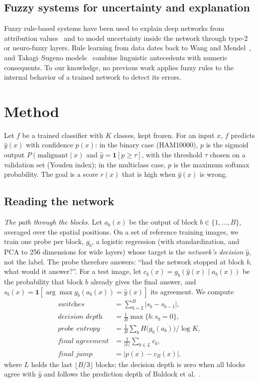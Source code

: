 \subsection{Fuzzy systems for uncertainty and explanation}
Fuzzy rule-based systems have been used to explain deep networks from attribution values~\cite{aghaeipoor2023} and to model uncertainty
inside the network through type-2 or neuro-fuzzy layers. Rule learning from data dates back to Wang and Mendel~\cite{wangmendel1992},
and Takagi--Sugeno models~\cite{takagi1985} combine linguistic antecedents with numeric consequents. To our knowledge, no previous work
applies fuzzy rules to the internal behavior of a trained network to detect its errors.

\section{Method}

Let $f$ be a trained classifier with $K$ classes, kept frozen. For an input $x$, $f$ predicts $\hat y(x)$ with confidence $p(x)$:
in the binary case (HAM10000), $p$ is the sigmoid output $P(\text{malignant}\mid x)$ and $\hat y = \mathbf{1}[p \ge \tau]$, with the
threshold $\tau$ chosen on a validation set (Youden index); in the multiclass case, $p$ is the maximum softmax probability.
The goal is a score $r(x)$ that is high when $\hat y(x)$ is wrong.

\subsection{Reading the network}
\label{sec:reading}

\textit{The path through the blocks.}
Let $a_b(x)$ be the output of block $b \in \{1,\dots,B\}$, averaged over the spatial positions. On a set of reference training images,
we train one probe per block, $g_b$, a logistic regression (with standardization, and PCA to 256 dimensions for wide layers) whose target
is the \emph{network's decision} $\hat y$, not the label. The probe therefore answers: ``had the network stopped at block $b$, what would
it answer?''. For a test image, let $c_b(x) = g_b(\hat y(x) \mid a_b(x))$ be the probability that block $b$ already gives the final answer,
and $s_b(x) = \mathbf{1}[\arg\max g_b(a_b(x)) = \hat y(x)]$ its agreement. We compute
\begin{align}
  \textit{switches} &= \textstyle\sum_{b=2}^{B} |s_b - s_{b-1}|, \\
  \textit{decision depth} &= \tfrac{1}{B}\max\{b : s_b = 0\}, \\
  \textit{probe entropy} &= \tfrac{1}{B}\textstyle\sum_{b} H\big(g_b(a_b)\big)/\log K, \\
  \textit{final agreement} &= \tfrac{1}{|L|}\textstyle\sum_{b \in L} c_b, \\
  \textit{final jump} &= |p(x) - c_B(x)|.
\end{align}
where $L$ holds the last $\lfloor B/3 \rfloor$ blocks; the decision depth is zero when all blocks agree with $\hat y$ and follows the prediction depth of Baldock et al.~\cite{baldock2021}.

